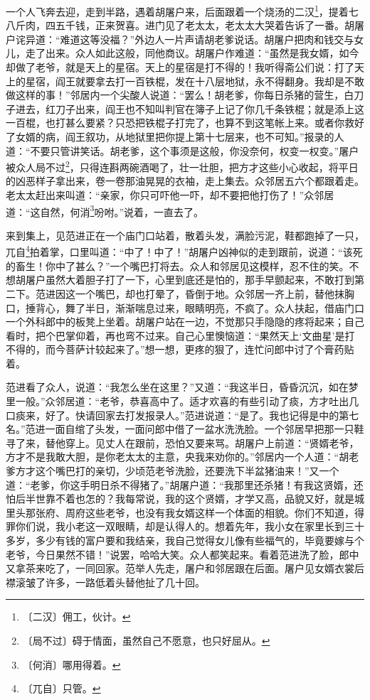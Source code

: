 \documentclass[12pt,UTF-8,openany]{ctexbook}
\begin{document}
\begin{normalsize}
    一个人飞奔去迎，走到半路，遇着胡屠户来，后面跟着一个烧汤的二汉\footnote{〔二汉〕佣工，伙计。}，提着七八斤肉，四五千钱，正来贺喜。进门见了老太太，老太太大哭着告诉了一番。胡屠户诧异道：“难道这等没福？”外边人一片声请胡老爹说话。胡屠户把肉和钱交与女儿，走了出来。众人如此这般，同他商议。胡屠户作难道：“虽然是我女婿，如今却做了老爷，就是天上的星宿。天上的星宿是打不得的！我听得斋公们说：打了天上的星宿，阎王就要拿去打一百铁棍，发在十八层地狱，永不得翻身。我却是不敢做这样的事！”邻居内一个尖酸人说道：“罢么！胡老爹，你每日杀猪的营生，白刀子进去，红刀子出来，阎王也不知叫判官在簿子上记了你几千条铁棍；就是添上这一百棍，也打甚么要紧？只恐把铁棍子打完了，也算不到这笔帐上来。或者你救好了女婿的病，阎王叙功，从地狱里把你提上第十七层来，也不可知。”报录的人道：“不要只管讲笑话。胡老爹，这个事须是这般，你没奈何，权变一权变。”屠户被众人局不过\footnote{〔局不过〕碍于情面，虽然自己不愿意，也只好屈从。}，只得连斟两碗酒喝了，壮一壮胆，把方才这些小心收起，将平日的凶恶样子拿出来，卷一卷那油晃晃的衣袖，走上集去。众邻居五六个都跟着走。老太太赶出来叫道：“亲家，你只可吓他一吓，却不要把他打伤了！”众邻居道：“这自然，何消\footnote{〔何消〕哪用得着。}吩咐。”说着，一直去了。
    
    来到集上，见范进正在一个庙门口站着，散着头发，满脸污泥，鞋都跑掉了一只，兀自\footnote{〔兀自〕只管。}拍着掌，口里叫道：“中了！中了！”胡屠户凶神似的走到跟前，说道：“该死的畜生！你中了甚么？”一个嘴巴打将去。众人和邻居见这模样，忍不住的笑。不想胡屠户虽然大着胆子打了一下，心里到底还是怕的，那手早颤起来，不敢打到第二下。范进因这一个嘴巴，却也打晕了，昏倒于地。众邻居一齐上前，替他抹胸口，捶背心，舞了半日，渐渐喘息过来，眼睛明亮，不疯了。众人扶起，借庙门口一个外科郎中的板凳上坐着。胡屠户站在一边，不觉那只手隐隐的疼将起来；自己看时，把个巴掌仰着，再也弯不过来。自己心里懊恼道：“果然天上‘文曲星’是打不得的，而今菩萨计较起来了。”想一想，更疼的狠了，连忙问郎中讨了个膏药贴着。
    
    范进看了众人，说道：“我怎么坐在这里？”又道：“我这半日，昏昏沉沉，如在梦里一般。”众邻居道：“老爷，恭喜高中了。适才欢喜的有些引动了痰，方才吐出几口痰来，好了。快请回家去打发报录人。”范进说道：“是了。我也记得是中的第七名。”范进一面自绾了头发，一面问郎中借了一盆水洗洗脸。一个邻居早把那一只鞋寻了来，替他穿上。见丈人在跟前，恐怕又要来骂。胡屠户上前道：“贤婿老爷，方才不是我敢大胆，是你老太太的主意，央我来劝你的。”邻居内一个人道：“胡老爹方才这个嘴巴打的亲切，少顷范老爷洗脸，还要洗下半盆猪油来！”又一个道：“老爹，你这手明日杀不得猪了。”胡屠户道：“我那里还杀猪！有我这贤婿，还怕后半世靠不着也怎的？我每常说，我的这个贤婿，才学又高，品貌又好，就是城里头那张府、周府这些老爷，也没有我女婿这样一个体面的相貌。你们不知道，得罪你们说，我小老这一双眼睛，却是认得人的。想着先年，我小女在家里长到三十多岁，多少有钱的富户要和我结亲，我自己觉得女儿像有些福气的，毕竟要嫁与个老爷，今日果然不错！”说罢，哈哈大笑。众人都笑起来。看着范进洗了脸，郎中又拿茶来吃了，一同回家。范举人先走，屠户和邻居跟在后面。屠户见女婿衣裳后襟滚皱了许多，一路低着头替他扯了几十回。
    

\end{normalsize}
\end{document}
